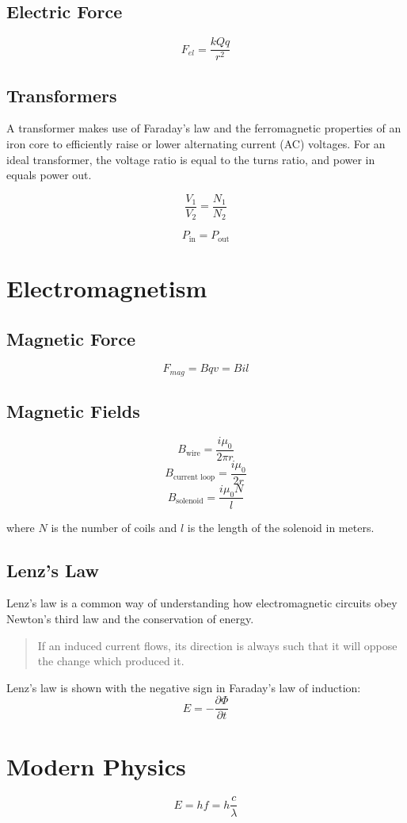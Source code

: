 \documentclass[oneside]{book} %
\theoremstyle{plain}
\begin{document}
\section{Electric Force}
\[F_{el} = \frac{k Q q}{r^2}\]

\section{Transformers}
A transformer makes use of Faraday's law and the ferromagnetic properties of an
iron core to efficiently raise or lower alternating current (AC) voltages.
For an ideal transformer, the voltage ratio is equal to the turns ratio, and
power in equals power out.

\[\frac{V_1}{V_2} = \frac{N_1}{N_2}\]

\[P_{\text{in}} = P_{\text{out}}\]

\chapter{Electromagnetism}

\section{Magnetic Force}
\[F_{mag} = B q v = B i l\]

\section{Magnetic Fields}
\[B_{\text{wire}} = \frac{i \mu_0}{2 \pi r}\]
\[B_{\text{current loop}} = \frac{i \mu_0}{2 r}\]
\[B_{\text{solenoid}} = \frac{i \mu_0 N}{l}\]

where \(N\) is the number of coils and \(l\) is the length of the solenoid in
meters.

\section{Lenz's Law}
Lenz's law is a common way of understanding how electromagnetic circuits obey
Newton's third law and the conservation of energy.
\begin{quote}
If an induced current flows, its direction is always such that it will oppose
the change which produced it.
\end{quote}
Lenz's law is shown with the negative sign in Faraday's law of induction:
\[{E}=-\frac{\partial \Phi}{\partial t}\]

\chapter{Modern Physics}
\[E = hf = h\frac{c}{\lambda}\]
\end{document}
